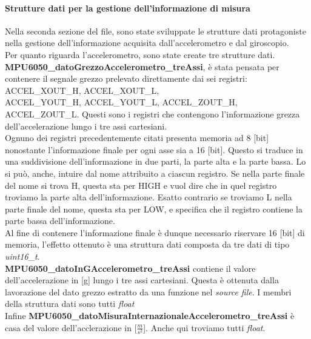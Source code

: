 \documentclass[11pt]{report}
\begin{document}
\paragraph{Strutture dati per la gestione dell'informazione di misura}
Nella seconda sezione del file, sono state sviluppate le strutture dati protagoniste nella gestione dell'informazione acquisita dall'accelerometro e dal giroscopio.\\
Per quanto riguarda l'accelerometro, sono state create tre strutture dati.\\
\textbf{MPU6050\_datoGrezzoAccelerometro\_treAssi}, è stata pensata per contenere il segnale grezzo prelevato direttamente dai sei registri: ACCEL\_XOUT\_H, ACCEL\_XOUT\_L,\\ACCEL\_YOUT\_H, ACCEL\_YOUT\_L, ACCEL\_ZOUT\_H, ACCEL\_ZOUT\_L. Questi sono i registri che contengono l'informazione grezza dell'accelerazione lungo i tre assi 
cartesiani.\\
Ognuno dei registri precedentemente citati presenta memoria ad 8 [bit] nonostante l'informazione finale per ogni asse sia a 16 [bit]. Questo si traduce in una suddivisione  dell'informazione in due parti, la parte alta e la parte bassa. Lo si può, anche, intuire dal nome attribuito a ciascun registro. Se nella parte finale del nome si trova H, questa sta per HIGH e vuol dire che in quel registro troviamo la parte alta dell'informazione. Esatto contrario se troviamo L nella parte finale del nome, questa sta per LOW, e specifica che il registro contiene la parte bassa dell'informazione.\\
Al fine di contenere l'informazione finale è dunque necessario riservare 16 [bit] di memoria, l'effetto ottenuto è una struttura dati composta da tre dati di tipo \textit{uint16\_t}.\\
\textbf{MPU6050\_datoInGAccelerometro\_treAssi} contiene il valore dell'accelerazione in [g] lungo i tre assi cartesiani. Questa è ottenuta dalla lavorazione del dato grezzo estratto da una funzione nel \textit{source file}. I membri della struttura dati sono tutti \textit{float}\\
Infine \textbf{MPU6050\_datoMisuraInternazionaleAccelerometro\_treAssi} è casa del valore dell'acclerazione in [$\frac{m}{s^2}$]. Anche qui troviamo tutti \textit{float}.
\end{document}
